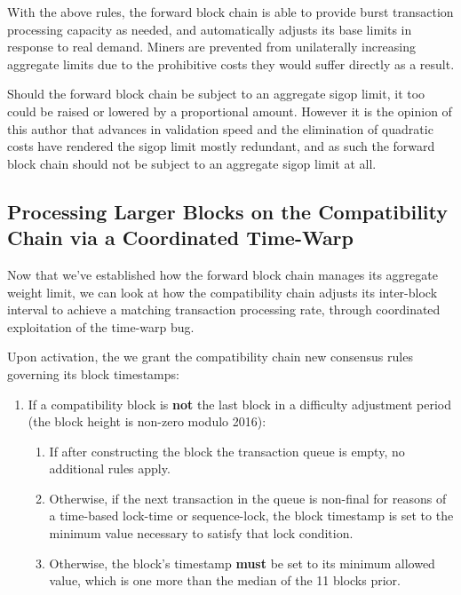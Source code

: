 \begin{enumerate}
With the above rules, the forward block chain is able to provide burst
transaction processing capacity as needed, and automatically adjusts
its base limits in response to real demand.  Miners are prevented from
unilaterally increasing aggregate limits due to the prohibitive costs
they would suffer directly as a result.

Should the forward block chain be subject to an aggregate sigop limit,
it too could be raised or lowered by a proportional amount.  However
it is the opinion of this author that advances in validation speed and
the elimination of quadratic costs have rendered the sigop limit
mostly redundant, and as such the forward block chain should not be
subject to an aggregate sigop limit at all.

\subsection{Processing Larger Blocks on the Compatibility Chain via a Coordinated Time-Warp}

Now that we've established how the forward block chain manages its
aggregate weight limit, we can look at how the compatibility chain
adjusts its inter-block interval to achieve a matching transaction
processing rate, through coordinated exploitation of the time-warp
bug.

Upon activation, the we grant the compatibility chain new consensus
rules governing its block timestamps:

\begin{enumerate}
  \item
    If a compatibility block is \textbf{not} the last block in a
    difficulty adjustment period (the block height is non-zero modulo
    \num{2016}):

    \begin{enumerate}
      \item
        If after constructing the block the transaction queue is
        empty, no additional rules apply.

      \item
        Otherwise, if the next transaction in the queue is non-final
        for reasons of a time-based lock-time or sequence-lock, the
        block timestamp is set to the minimum value necessary to
        satisfy that lock condition.

      \item
        Otherwise, the block's timestamp \textbf{must} be set to its
        minimum allowed value, which is one more than the median of
        the \num{11} blocks prior.
    \end{enumerate}


\end{enumerate}
\end{enumerate}
